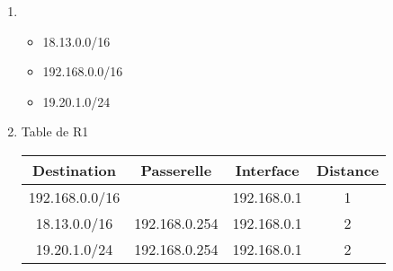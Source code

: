 \documentclass[a4paper,11pt]{article}
\begin{document}
\begin{exo}
    \begin{enumerate}
        \item \begin{itemize}
            \item 18.13.0.0/16
            \item 192.168.0.0/16
            \item 19.20.1.0/24
        \end{itemize}
        \item Table de R1
        \begin{center}
            \begin{tabular}{|*{4}{c|}}
                \hline
                Destination & Passerelle & Interface & Distance \\
                \hline
                192.168.0.0/16 & & 192.168.0.1 & 1\\
                \hline
                18.13.0.0/16 & 192.168.0.254 & 192.168.0.1 & 2\\
                \hline
                19.20.1.0/24 & 192.168.0.254 & 192.168.0.1 & 2\\
                \hline
            \end{tabular}
        \end{center}
    \end{enumerate}
\end{exo}
\end{document}
